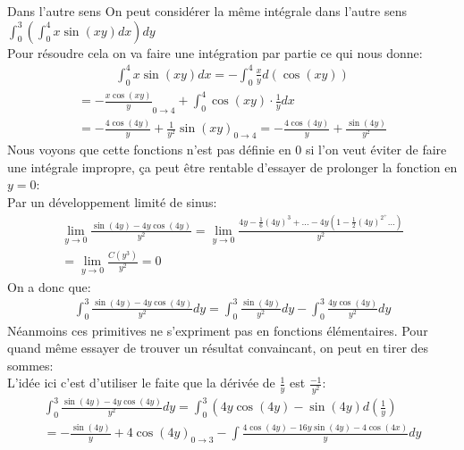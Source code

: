 \begin{parag}{Dans l'autre sens}
    On peut considérer la même intégrale  dans l'autre sens $\int_0^3\left(\int_0^4 x \sin\left(xy\right)dx\right)dy$\\
    Pour résoudre cela on va faire une intégration par partie ce qui nous donne:
    \begin{align*} 
        \int_0^4 x \sin\left(xy\right)dx =  -\int_0^4\frac{x}{y}d\left(\cos\left(xy\right)\right) 
    \end{align*}
    \begin{align*} 
        = - \frac{x\cos\left(xy\right)}{y}_{0\to 4} + \int_0^4 \cos\left(xy\right) \cdot  \frac{1}{y}dx\\
        = -\frac{4\cos\left(4y\right)}{y} + \frac{1}{y^2}\sin\left(xy\right)_{0 \to 4} = -\frac{4\cos\left(4y\right)}{y} + \frac{\sin\left(4y\right)}{y^2}
    \end{align*}
    Nous voyons que cette fonctions n'est pas définie en $0$ si l'on veut éviter de faire une intégrale impropre, ça peut être rentable d'essayer de prolonger la fonction en $y = 0$:\\
    Par un développement limité de sinus:
    \begin{align*} 
        \lim_{y  \to 0} \frac{\sin\left(4y\right) - 4y\cos\left(4y\right)}{y^2} =  \lim_{y \to 0} \frac{4y - \frac{1}{6}\left(4y\right)^3 + \ldots - 4y\left(1 - \frac{1}{2}\left(4y\right)^2^+ \ldots \right)}{y^2} \\
        = \lim_{y \to 0} \frac{C\left(y^3\right)}{y^2} =  0
    \end{align*}
    On a donc que:
    \begin{align*} 
        \int_0^3 \frac{\sin\left(4y\right) - 4y\cos\left(4y\right)}{y^2}dy = \int_0^3 \frac{\sin\left(4y\right)}{y^2}dy - \int_0^3 \frac{4y\cos\left(4y\right)}{y^2} dy
    \end{align*}
    Néanmoins ces primitives ne s'expriment pas en fonctions élémentaires. Pour quand même essayer de trouver un résultat convaincant, on peut en tirer des sommes:\\
L'idée ici c'est d'utiliser le faite que la dérivée de $\frac{1}{y}$ est $\frac{-1}{y^2}$:
    \begin{align*} 
        \int_0^3 \frac{\sin\left(4y\right)-4y\cos\left(4y\right)}{y^2} dy = \int_0^3\left(4y\cos\left(4y\right)-\sin\left(4y\right)d\left(\frac{1}{y}\right)\\
            = -\frac{\sin\left(4y\right)}{y} + 4\cos\left(4y\right)_{0 \to 3} - \int \frac{4\cos\left(4y\right) - 16y\sin\left(4y\right) - 4\cos\left(4x\right)}{y} dy\\

\end{align*}
\end{parag}
